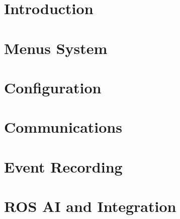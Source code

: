 \documentclass{report}
\begin{document}
\tableofcontents
\newpage

\chapter{Introduction}


\chapter{Menus System}


\chapter{Configuration}


\chapter{Communications}


\chapter{Event Recording}


\chapter[ROS Integration]{ROS AI and Integration}

\end{document}
